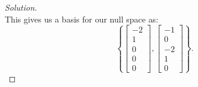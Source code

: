 \documentclass[12pt]{amsart}
\newenvironment{solution}
{\begin{proof}[Solution]}
{\end{proof}}
\begin{document}
\begin{onehalfspace}
\begin{solution}
\begin{displaymath}
            \end{displaymath}
            This gives us a basis for our null space as:
            \begin{displaymath}
                \left\{
                    \left[\begin{matrix}
                              -2\\
                              1\\
                              0\\
                              0\\
                              0
                    \end{matrix}\right],
                    \left[\begin{matrix}
                              -1\\
                              0\\
                              -2\\
                              1\\
                              0
                    \end{matrix}\right]
                \right\}.
            \end{displaymath}


\end{solution}
\end{onehalfspace}
\end{document}

